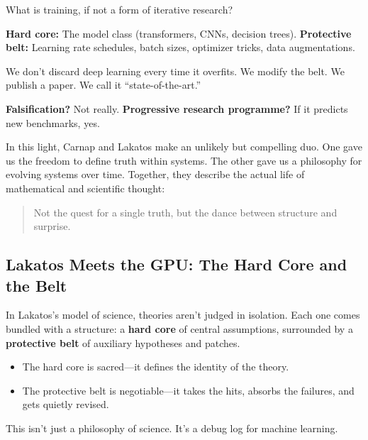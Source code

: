 \begin{tcolorbox}[colback=gray!5!white, colframe=black, title=\textbf{Sidebar: Machine Learning as a Lakatosian Ritual}, fonttitle=\bfseries, arc=1.5mm, boxrule=0.4pt]
What is training, if not a form of iterative research?

\textbf{Hard core:} The model class (transformers, CNNs, decision trees).  
\textbf{Protective belt:} Learning rate schedules, batch sizes, optimizer tricks, data augmentations.

We don’t discard deep learning every time it overfits. We modify the belt. We publish a paper. We call it “state-of-the-art.”

\medskip

\textbf{Falsification?} Not really.  
\textbf{Progressive research programme?} If it predicts new benchmarks, yes.

\end{tcolorbox}

\vspace{1em}

In this light, Carnap and Lakatos make an unlikely but compelling duo. One gave us the freedom to define truth within systems. The other gave us a philosophy for evolving systems over time. Together, they describe the actual life of mathematical and scientific thought:

\begin{quote}
    Not the quest for a single truth,  
    but the dance between structure and surprise.
\end{quote}

\subsection{Lakatos Meets the GPU: The Hard Core and the Belt}

In Lakatos’s model of science, theories aren’t judged in isolation. Each one comes bundled with a structure: a \textbf{hard core} of central assumptions, surrounded by a \textbf{protective belt} of auxiliary hypotheses and patches.

\begin{itemize}
  \item The hard core is sacred—it defines the identity of the theory.
  \item The protective belt is negotiable—it takes the hits, absorbs the failures, and gets quietly revised.
\end{itemize}

This isn’t just a philosophy of science. It’s a debug log for machine learning.

